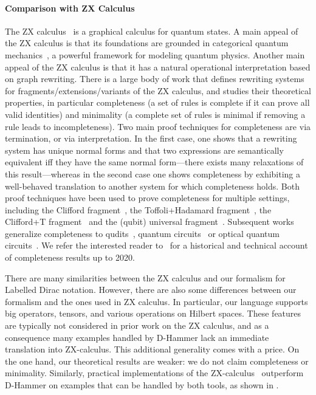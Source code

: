 \paragraph*{Comparison with ZX Calculus}
The ZX calculus~\cite{DBLP:conf/icalp/CoeckeD08,coecke2011interacting}
is a graphical calculus for quantum states. A main appeal of the ZX
calculus is that its foundations are grounded in categorical quantum
mechanics~\cite{DBLP:conf/lics/AbramskyC04}, a powerful framework for
modeling quantum physics. Another main appeal of the ZX calculus is
that it has a natural operational interpretation based on graph
rewriting. There is a large body of work that defines rewriting
systems for fragments/extensions/variants of the ZX calculus, and
studies their theoretical properties, in particular completeness (a
set of rules is complete if it can prove all valid identities) and
minimality (a complete set of rules is minimal if removing a rule
leads to incompleteness). Two main proof techniques for completeness
are via termination, or via interpretation. In the first case, one
shows that a rewriting system has unique normal forms and that two
expressions are semantically equivalent iff they have the same normal
form---there exists many relaxations of this result---whereas in the
second case one shows completeness by exhibiting a well-behaved
translation to another system for which completeness holds. Both proof
techniques have been used to prove completeness for multiple settings,
including the Clifford fragment~\cite{backens2014zx}, the
Toffoli+Hadamard fragment~\cite{hadzi15zx}, the Clifford+T
fragment~\cite{jeandel2018complete} and the (qubit) universal
fragment~\cite{HNW18,JeandelPV18beyond}. Subsequent works generalize
completeness to qudits~\cite{Poor2023}, quantum
circuits~\cite{DBLP:conf/lics/ClementHMPV23} or optical quantum
circuits~\cite{clement_et_al:2022}. We refer the interested reader
to~\cite{vandewetering2020zx} for a historical and technical account
of completeness results up to 2020.

There are many similarities between the ZX calculus and our formalism
for Labelled Dirac notation. However, there are also some differences
between our formalism and the ones used in ZX calculus. In particular,
our language supports big operators, tensors, and various operations
on Hilbert spaces. These features are typically not considered in
prior work on the ZX calculus, and as a consequence many examples
handled by D-Hammer lack an immediate translation into ZX-calculus.
This additional generality comes with a price. On the one hand, our
theoretical results are weaker: we do not claim completeness or
minimality. Similarly, practical implementations of the ZX-calculus~\cite{kissinger2020pyzx,9868772} outperform D-Hammer on examples
that can be handled by both tools, as shown in .


